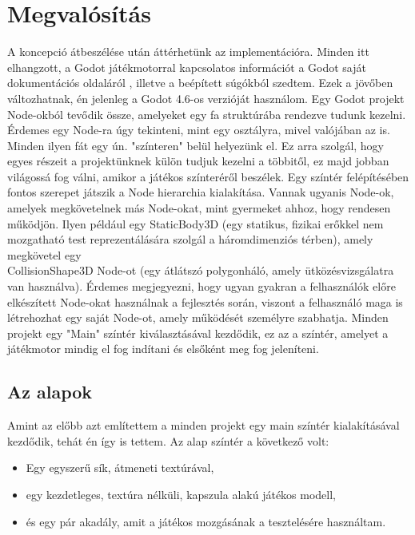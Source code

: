 \chapter{Megvalósítás}
\label{chap:implementation}

A koncepció átbeszélése után áttérhetünk az implementációra. Minden itt elhangzott, a Godot játékmotorral kapcsolatos információt a Godot saját dokumentációs oldaláról \cite{GodotDocs}, illetve a beépített súgókból szedtem. Ezek a jövőben változhatnak, én jelenleg a Godot 4.6-os verzióját használom. Egy Godot projekt Node-okból tevődik össze, amelyeket egy fa struktúrába rendezve tudunk kezelni. Érdemes egy Node-ra úgy tekinteni, mint egy osztályra, mivel valójában az is. Minden ilyen fát egy ún. "színteren" belül helyezünk el. Ez arra szolgál, hogy egyes részeit a projektünknek külön tudjuk kezelni a többitől, ez majd jobban világossá fog válni, amikor a játékos színteréről beszélek. Egy színtér felépítésében fontos szerepet játszik a Node hierarchia kialakítása. Vannak ugyanis Node-ok, amelyek megkövetelnek más Node-okat, mint gyermeket ahhoz, hogy rendesen működjön. Ilyen például egy StaticBody3D (egy statikus, fizikai erőkkel nem mozgatható test reprezentálá\-sára szolgál a háromdimenziós térben), amely megkövetel egy\\ CollisionShape3D Node-ot (egy átlátszó polygonháló, amely ütközésvizsgálatra van használva). Érdemes megjegyezni, hogy ugyan gyakran a felhasználók előre elkészített Node-okat használnak a fejlesztés során, viszont a felhasználó maga is létrehoz\-hat egy saját Node-ot, amely működését személyre szabhatja. Minden projekt egy "Main" színtér kiválasztásával kezdődik, ez az a színtér, amelyet a játékmotor mindig el fog indítani és elsőként meg fog jeleníteni.

\section{Az alapok}

Amint az előbb azt említettem a minden projekt egy main színtér kialakításával kezdődik, tehát én így is tettem. Az alap színtér a következő volt:

\begin{itemize}
	\item Egy egyszerű sík, átmeneti textúrával,
	\item egy kezdetleges, textúra nélküli, kapszula alakú játékos modell,
	\item és egy pár akadály, amit a játékos mozgásának a tesztelésére használtam.
\end{itemize}

